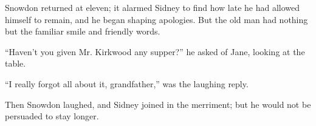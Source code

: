 Snowdon returned at eleven; it alarmed Sidney to find how late he had
allowed himself to remain, and he began shaping apologies. But the old
man had nothing but the familiar smile and friendly words.

``Haven't you given Mr. Kirkwood any supper?'' he asked of Jane, looking
at the table.

{\protect\hypertarget{58}{}{}}``I really forgot all about it,
grandfather,'' was the laughing reply.

Then Snowdon laughed, and Sidney joined in the merriment; but he would
not be persuaded to stay longer.
